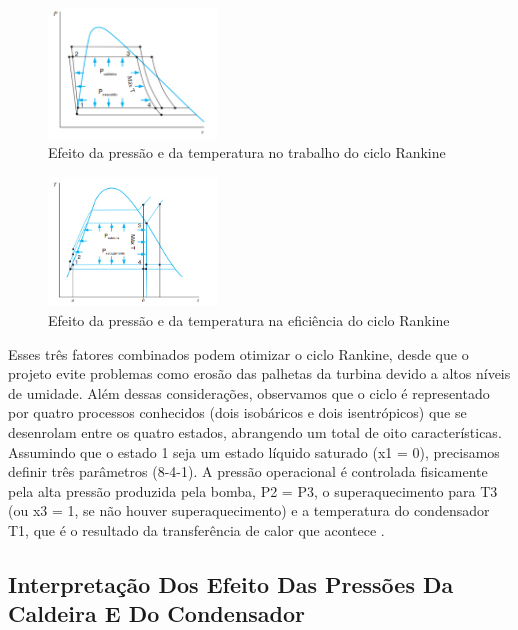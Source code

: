 \documentclass[
	article,			%
	11pt,				%
	oneside,			%
	a4paper,			%
	english,			%
	brazil,				%
	sumario=tradicional
	]{abntex2}
\begin{document}
\begin{figure}[h]
	\centering
	\includegraphics[width=0.4\textwidth]{./images/efeito-pressao-temperatura.png}
	\caption{Efeito da pressão e da temperatura no trabalho do ciclo Rankine}
	\label{fig:efeito-pressao-temperatura}
\end{figure}

\begin{figure}
	\centering
	\includegraphics[width=0.4\textwidth]{./images/efeito-pressao-temperatura-eficiencia.png}
	\caption{Efeito da pressão e da temperatura na eficiência do ciclo Rankine}
	\label{fig:efeito-pressao-temperatura-eficiencia}
\end{figure}

Esses três fatores combinados podem otimizar o ciclo Rankine, desde que o projeto evite problemas como erosão das palhetas da turbina devido a altos níveis de umidade.
Além dessas considerações, observamos que o ciclo é representado por quatro processos conhecidos (dois isobáricos e dois isentrópicos) que se desenrolam entre os quatro estados, abrangendo um total de oito características. Assumindo que o estado 1 seja um estado líquido saturado (x1 = 0), precisamos definir três parâmetros (8-4-1). A pressão operacional é controlada fisicamente pela alta pressão produzida pela bomba, P2 = P3, o superaquecimento para T3 (ou x3 = 1, se não houver superaquecimento) e a temperatura do condensador T1, que é o resultado da transferência de calor que acontece \cite{borgnakke-2020}.

\subsection{Interpretação Dos Efeito Das Pressões Da Caldeira E Do Condensador}
\end{document}
